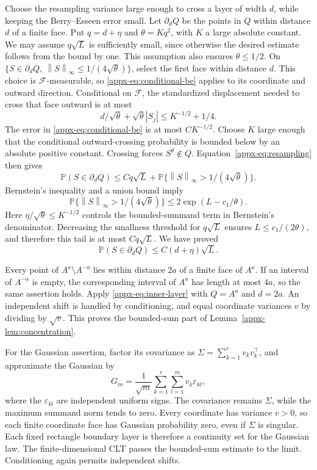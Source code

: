 \documentclass[11pt,letterpaper]{article}
\theoremstyle{remark}
\newcommand{\Pp}{\mathbb P}
\newcommand{\norm}[1]{\left\lVert#1\right\rVert}
\begin{document}
Choose the resampling variance large enough to cross a layer of width
\(d\), while keeping the Berry--Esseen error small. Let \(\partial_d Q\)
be the points in \(Q\) within distance \(d\) of a finite face. Put
\(q=d+\eta\) and \(\theta=Kq^2\), with \(K\) a large absolute
constant. We may assume \(q\sqrt L\) is sufficiently small, since
otherwise the desired estimate follows from the bound by one. This
assumption also ensures \(\theta\le1/2\).
On
\(\{S\in\partial_d Q,\ \norm S_\infty\le1/(4\sqrt\theta)\}\),
select the first face within distance \(d\). This choice is
\(\mathcal F\)-measurable, so \eqref{appx-eq:conditional-be} applies to
its coordinate and outward direction. Conditional on \(\mathcal F\), the standardized displacement needed to cross that
face outward is at most
\[
 d/\sqrt\theta+\sqrt\theta|S_j|
 \le K^{-1/2}+1/4.
\]
The error in \eqref{appx-eq:conditional-be} is at most \(C K^{-1/2}\).
Choose \(K\) large enough that the conditional outward-crossing
probability is bounded below by an absolute positive constant.
Crossing forces \(S^\theta\notin Q\). Equation~\eqref{appx-eq:resampling}
then gives
\[
 \Pp(S\in\partial_d Q)
 \le Cq\sqrt L
 +\Pp\{\norm S_\infty>1/(4\sqrt\theta)\}.
\]
Bernstein's inequality and a union bound imply
\[
 \Pp\{\norm S_\infty>1/(4\sqrt\theta)\}
 \le2\exp(L-c_1/\theta).
\]
Here \(\eta/\sqrt\theta\le K^{-1/2}\) controls the bounded-summand
term in Bernstein's denominator. Decreasing the smallness threshold for
\(q\sqrt L\) ensures \(L\le c_1/(2\theta)\), and therefore this
tail is at most \(Cq\sqrt L\). We have proved
\begin{equation}
 \Pp(S\in\partial_d Q)\le C(d+\eta)\sqrt L.
 \label{appx-eq:inner-layer}
\end{equation}

Every point of \(A^a\setminus A^{-a}\) lies within distance \(2a\)
of a finite face of \(A^a\). If an interval of \(A^{-a}\) is empty,
the corresponding interval of \(A^a\) has length at most \(4a\), so
the same assertion holds. Apply \eqref{appx-eq:inner-layer} with
\(Q=A^a\) and \(d=2a\). An independent shift is handled by
conditioning, and equal coordinate variances \(v\) by dividing by
\(\sqrt v\). This proves the bounded-sum part of
Lemma~\ref{appx-lem:concentration}.

For the Gaussian assertion, factor its covariance as
\(\Sigma=\sum_{k=1}^r v_kv_k^\top\), and approximate the Gaussian by
\[
 G_m=\frac1{\sqrt m}\sum_{k=1}^r\sum_{l=1}^m v_k\varepsilon_{kl},
\]
where the \(\varepsilon_{kl}\) are independent uniform signs.
The covariance remains \(\Sigma\), while the maximum summand norm
tends to zero. Every coordinate has variance \(v>0\), so each finite coordinate face
has Gaussian probability zero, even if \(\Sigma\) is singular. Each
fixed rectangle boundary layer is therefore a continuity set for the
Gaussian law. The finite-dimensional CLT passes the bounded-sum estimate
to the limit. Conditioning again permits independent shifts.
\end{document}
